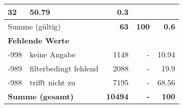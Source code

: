 \begin{longtable}{lXrrr}
       \num{32} &
       \num[round-mode=places,round-precision=2]{50.79} &
         \num[round-mode=places,round-precision=2]{0.3} \\
     \midrule
     \multicolumn{2}{l}{Summe (gültig)} &
       \textbf{\num{63}} &
     \textbf{\num{100}} &
       \textbf{\num[round-mode=places,round-precision=2]{0.6}} \\
     \multicolumn{5}{l}{\textbf{Fehlende Werte}}\\
       -998 &
       keine Angabe &
         \num{1148} &
        - &
         \num[round-mode=places,round-precision=2]{10.94} \\
       -989 &
       filterbedingt fehlend &
         \num{2088} &
        - &
         \num[round-mode=places,round-precision=2]{19.9} \\
       -988 &
       trifft nicht zu &
         \num{7195} &
        - &
         \num[round-mode=places,round-precision=2]{68.56} \\
     \midrule
     \multicolumn{2}{l}{\textbf{Summe (gesamt)}} &
          \textbf{\num{10494}} &
        \textbf{-} &
        \textbf{\num{100}} \\
     \bottomrule
     \end{longtable}
     
